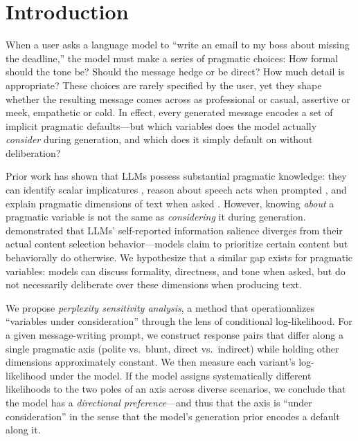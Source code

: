 \section{Introduction}
\label{sec:intro}

When a user asks a language model to ``write an email to my boss about missing the deadline,'' the model must make a series of pragmatic choices: How formal should the tone be? Should the message hedge or be direct? How much detail is appropriate? These choices are rarely specified by the user, yet they shape whether the resulting message comes across as professional or casual, assertive or meek, empathetic or cold. In effect, every generated message encodes a set of implicit pragmatic defaults---but which variables does the model actually \emph{consider} during generation, and which does it simply default on without deliberation?

 Prior work has shown that LLMs possess substantial pragmatic knowledge: they can identify scalar implicatures \citep{cho2024pragmatic, ruis2024goldilocks}, reason about speech acts when prompted \citep{sato2025pragmatic}, and explain pragmatic dimensions of text when asked \citep{lin2024probing}. However, knowing \emph{about} a pragmatic variable is not the same as \emph{considering} it during generation. \citet{trienes2025behavioral} demonstrated that LLMs' self-reported information salience diverges from their actual content selection behavior---models claim to prioritize certain content but behaviorally do otherwise. We hypothesize that a similar gap exists for pragmatic variables: models can discuss formality, directness, and tone when asked, but do not necessarily deliberate over these dimensions when producing text.

 We propose \emph{perplexity sensitivity analysis}, a method that operationalizes ``variables under consideration'' through the lens of conditional log-likelihood. For a given message-writing prompt, we construct response pairs that differ along a single pragmatic axis (\eg polite vs.\ blunt, direct vs.\ indirect) while holding other dimensions approximately constant. We then measure each variant's log-likelihood under the model. If the model assigns systematically different likelihoods to the two poles of an axis across diverse scenarios, we conclude that the model has a \emph{directional preference}---and thus that the axis is ``under consideration'' in the sense that the model's generation prior encodes a default along it.

